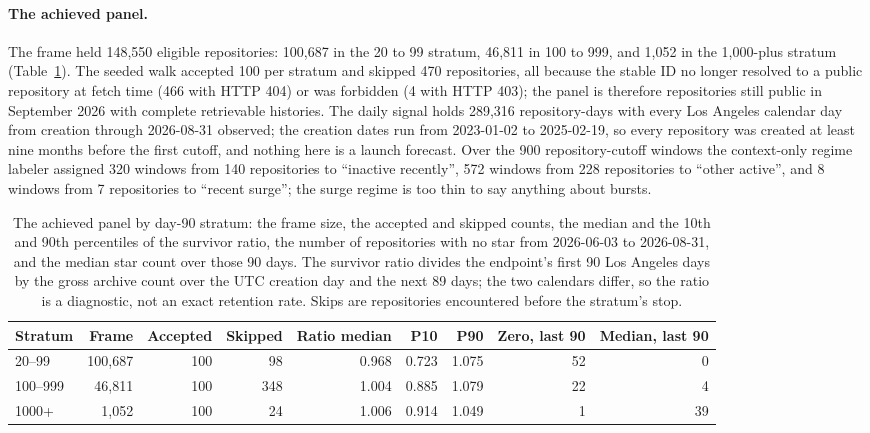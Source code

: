 \paragraph{The achieved panel.} The frame held 148,550 eligible repositories: 100,687 in the 20 to 99
stratum, 46,811 in 100 to 999, and 1,052 in the 1,000-plus stratum (Table~\ref{tab:panel}). The seeded walk
accepted 100 per stratum and skipped 470 repositories, all because the stable ID no longer resolved to a
public repository at fetch time (466 with HTTP 404) or was forbidden (4 with HTTP 403); the panel is
therefore repositories still public in September 2026 with complete retrievable histories. The daily signal
holds 289,316 repository-days with every Los Angeles calendar day from creation through 2026-08-31 observed;
the creation dates run from 2023-01-02 to 2025-02-19, so every repository was created at least nine months
before the first cutoff, and nothing here is a launch forecast. Over the 900 repository-cutoff windows the
context-only regime labeler assigned 320 windows from 140 repositories to ``inactive recently'', 572 windows
from 228 repositories to ``other active'', and 8 windows from 7 repositories to ``recent surge''; the surge
regime is too thin to say anything about bursts.

\begin{table}[htbp]
\centering\footnotesize
\caption{The achieved panel by day-90 stratum: the frame size, the accepted and skipped counts, the median
and the 10th and 90th percentiles of the survivor ratio, the number of repositories with no star from
2026-06-03 to 2026-08-31, and the median star count over those 90 days. The survivor ratio divides the
endpoint's first 90 Los Angeles days by the gross archive count over the UTC creation day and the next 89
days; the two calendars differ, so the ratio is a diagnostic, not an exact retention rate. Skips are
repositories encountered before the stratum's stop.}
\label{tab:panel}
\begin{tabular}{lrrrrrrrr}
\toprule
Stratum & Frame & Accepted & Skipped & Ratio median & P10 & P90 & Zero, last 90 & Median, last 90 \\
\midrule
20--99 & 100,687 & 100 & 98 & 0.968 & 0.723 & 1.075 & 52 & 0 \\
100--999 & 46,811 & 100 & 348 & 1.004 & 0.885 & 1.079 & 22 & 4 \\
1000+ & 1,052 & 100 & 24 & 1.006 & 0.914 & 1.049 & 1 & 39 \\
\bottomrule
\end{tabular}
\end{table}

